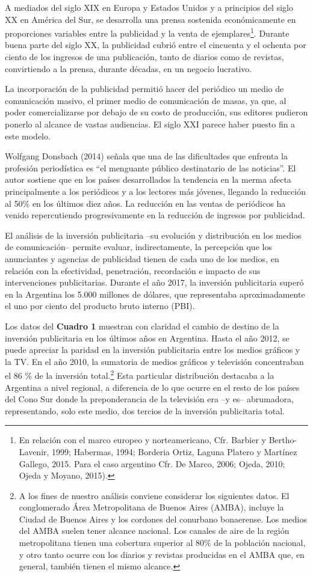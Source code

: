 A mediados del siglo XIX en Europa y Estados Unidos y a principios del siglo XX en América del Sur, se desarrolla una prensa sostenida económicamente en proporciones variables entre la publicidad y la venta de ejemplares\footnote{En relación con el marco europeo y norteamericano, Cfr. Barbier y Bertho-Lavenir, 1999; Habermas, 1994; Borderia Ortiz, Laguna Platero y Martínez Gallego, 2015. Para el caso argentino Cfr. De Marco, 2006; Ojeda, 2010; Ojeda y Moyano, 2015).}. Durante buena parte del siglo XX, la publicidad cubrió entre el cincuenta y el ochenta por ciento de los ingresos de una publicación, tanto de diarios como de revistas, convirtiendo a la prensa, durante décadas, en un negocio lucrativo.

La incorporación de la publicidad permitió hacer del periódico un medio de comunicación masivo, el primer medio de comunicación de masas, ya que, al poder comercializarse por debajo de su costo de producción, sus editores pudieron ponerlo al alcance de vastas audiencias. El siglo XXI parece haber puesto fin a este modelo.

Wolfgang Donsbach (2014) señala que una de las dificultades que enfrenta la profesión periodística es ``el menguante público destinatario de las noticias''. El autor sostiene que en los países desarrollados la tendencia en la merma afecta principalmente a los periódicos y a los lectores más jóvenes, llegando la reducción al 50\% en los últimos diez años. La reducción en las ventas de periódicos ha venido repercutiendo progresivamente en la reducción de ingresos por publicidad.

El análisis de la inversión publicitaria --su evolución y distribución en los medios de comunicación-- permite evaluar, indirectamente, la percepción que los anunciantes y agencias de publicidad tienen de cada uno de los medios, en relación con la efectividad, penetración, recordación e impacto de sus intervenciones publicitarias. Durante el año 2017, la inversión publicitaria superó en la Argentina los 5.000 millones de dólares, que representaba aproximadamente el uno por ciento del producto bruto interno (PBI).

Los datos del \textbf{Cuadro 1} muestran con claridad el cambio de destino de la inversión publicitaria en los últimos años en Argentina. Hasta el año 2012, se puede apreciar la paridad en la inversión publicitaria entre los medios gráficos y la TV. En el año 2010, la sumatoria de medios gráficos y televisión concentraban el 86 \% de la inversión total.\footnote{A los fines de nuestro análisis conviene considerar los siguientes datos. El conglomerado Área Metropolitana de Buenos Aires (AMBA), incluye la Ciudad de Buenos Aires y los cordones del conurbano bonaerense. Los medios del AMBA suelen tener alcance nacional. Los canales de aire de la región metropolitana tienen una cobertura superior al 80\% de la población nacional, y otro tanto ocurre con los diarios y revistas producidas en el AMBA que, en general, también tienen el mismo alcance.} Esta particular distribución destacaba a la Argentina a nivel regional, a diferencia de lo que ocurre en el resto de los países del Cono Sur donde la preponderancia de la televisión era --y es-- abrumadora, representando, solo este medio, dos tercios de la inversión publicitaria total.


